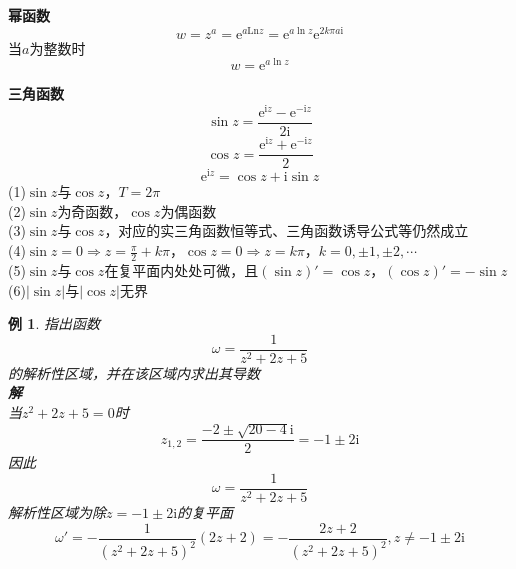 \documentclass[12pt, a4paper, twoside]{ctexbook}
\newtheorem{example}[theorem]{例}
\begin{document}
\textbf{幂函数}
$$
w=z^a=\mathrm{e}^{a\mathrm{Ln}z}=\mathrm{e}^{a\ln z}\mathrm{e}^{2k\pi a \mathrm{i}}
$$
当$a$为整数时
$$
w=\mathrm{e}^{a\ln z}
$$

\textbf{三角函数}
$$
\sin z=\frac{\mathrm{e}^{\mathrm{i}z}-\mathrm{e}^{-\mathrm{i}z}}{2\mathrm{i}}
$$
$$
\cos z=\frac{\mathrm{e}^{\mathrm{i}z}+\mathrm{e}^{-\mathrm{i}z}}{2}
$$
$$
\mathrm{e}^{\mathrm{i}z}=\cos z+\mathrm{i}\sin z
$$
(1)$\sin z$与$\cos z$，$T=2\pi$\\
(2)$\sin z$为奇函数，$\cos z$为偶函数\\
(3)$\sin z$与$\cos z$，对应的实三角函数恒等式、三角函数诱导公式等仍然成立\\
(4)$\sin z=0\Rightarrow z=\frac{\pi}{2}+k\pi$，$\cos z=0\Rightarrow z=k\pi$，$k=0,\pm 1,\pm 2,\cdots$\\
(5)$\sin z$与$\cos z$在复平面内处处可微，且$\left(\sin z\right)'=\cos z$，$\left(\cos z\right)'=-\sin z$\\
(6)$\left|\sin z\right|$与$\left|\cos z\right|$无界
\begin{example}
	指出函数
	$$
	\omega = \frac{1}{z^2+2z+5}
	$$
	\hspace*{2em}的解析性区域，并在该区域内求出其导数\\
	\hspace*{1em}\textbf{解}\\
	\hspace*{2em}当$z^2+2z+5=0$时
	$$
	z_{1,2}=\frac{-2\pm \sqrt{20-4}\mathrm{i}}{2}=-1\pm2\mathrm{i}
	$$
	\hspace*{2em}因此
	$$
	\omega = \frac{1}{z^2+2z+5}
	$$
	\hspace*{2em}解析性区域为除$z=-1\pm2\mathrm{i}$的复平面
	$$
	\omega ' = -\frac{1}{\left(z^2+2z+5\right)^2}\left(2z+2\right)= -\frac{2z+2}{\left(z^2+2z+5\right)^2},z\neq -1\pm2\mathrm{i}
	$$
\end{example}
\end{document}
